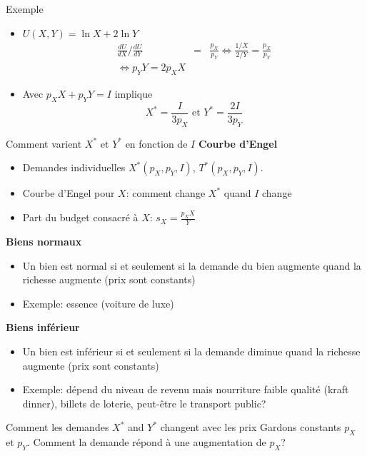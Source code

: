 \documentclass[handout]{beamer}
\newenvironment{iPar}[1]{\textbf{#1} \begin{itemize}}{\end{itemize}}
\begin{document}
\begin{frame}{Exemple}
\begin{itemize}
\item $U(X,Y) = \ln X +  2\ln Y$ \pause
\begin{eqnarray*}\frac{dU}{dX}\Bigg/\frac{dU}{dY} &=& \frac{p_X}{p_Y} \iff \frac{1/X}{2/Y} = \frac{p_X}{p_Y} \\ \iff  p_Y Y = 2p_X X \end{eqnarray*}
\item Avec $p_X X + p_Y Y =  I$ implique $$X^* = \frac{I}{3p_X} \textrm{ et } Y^* = \frac{2I}{3p_Y}$$

\end{itemize}
\end{frame}


\begin{frame}{Comment varient $X^*$ et $Y^*$ en fonction de $I$}
\begin{iPar}{Courbe d'Engel}
\item Demandes individuelles  $X^*(p_X,p_Y,I)$, $T^*(p_X,p_Y,I)$.
\item Courbe d'Engel pour $X$: comment change $X^*$ quand $I$ change
\item Part du budget consacré à $X$: $s_X = \frac{p_X X}{Y}$
\end{iPar} 

\begin{iPar}{Biens normaux}
\item Un bien est normal si et seulement si la demande du bien augmente quand la richesse augmente (prix sont constants)
\item Exemple: essence (voiture de luxe)
\end{iPar}

\begin{iPar}{Biens inférieur}
\item Un bien est inférieur si et seulement si la demande diminue quand la richesse augmente (prix sont constants)
\item Exemple:  dépend du niveau de revenu mais nourriture faible qualité (kraft dinner), billets de loterie, peut-être le transport public?
\end{iPar}

\end{frame}

\begin{frame}{Comment les demandes $X^*$ and $Y^*$ changent avec les prix}
Gardons constants $p_X$ et $p_Y$. Comment la demande répond à une augmentation de $p_X$? 

\end{frame}
\end{document}
